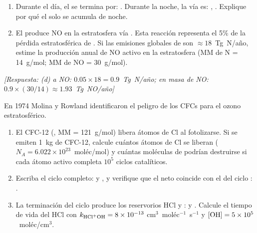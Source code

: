\begin{bloque_ejercicios}
\begin{ejercicios}
\begin{enumerate}[label=\alph*)]
    \item Durante el d\'ia, el  se termina por:
          .
          Durante la noche, la v\'ia es:
          ,
          .
          Explique por qu\'e el  solo se acumula
          de noche.

    \item El  produce NO en la estratosfera v\'ia
          .
          Esta reacci\'on representa el 5\% de la p\'erdida
          estratosf\'erica de .
          Si las emisiones globales de  son
          $\approx18$~Tg~N/a\~no, estime la producci\'on
          anual de NO activo en la estratosfera
          (MM de N = 14~g/mol;
          MM de NO = 30~g/mol).
\end{enumerate}

\textit{[Respuesta:
(d)  a NO: $0.05\times18 = 0.9$~Tg~N/a\~no;
    en masa de NO: $0.9\times(30/14)
    \approx 1.93$~Tg~NO/a\~no]}

\item En 1974 Molina y Rowland identificaron el peligro
de los CFCs para el ozono estratosf\'erico.

\begin{enumerate}[label=\alph*)]
    \item El CFC-12 (, MM = 121~g/mol)
          libera \'atomos de Cl al fotolizarse.
          Si se emiten \SI{1}{\kilo\gram} de CFC-12,
          calcule cu\'antos \'atomos de Cl se liberan
          ($N_A = 6.022\times10^{23}$~mol\'ec/mol)
          y cu\'antas mol\'eculas de  podr\'ian
          destruirse si cada \'atomo activo completa
          $10^5$ ciclos catal\'iticos.

    \item Escriba el ciclo  completo:
           y
          ,
          y verifique que el neto coincide con el del
          ciclo : .

    \item La terminaci\'on del ciclo  produce
          los reservorios HCl y :
           y
          .
          Calcule el tiempo de vida del HCl
          con $k_{\ce{HCl+OH}} = 8\times10^{-13}$
          cm$^3$~mol\'ec$^{-1}$~s$^{-1}$ y
          $[\ce{OH}] = 5\times10^5$~mol\'ec/cm$^3$.


\end{enumerate}
\end{ejercicios}
\end{bloque_ejercicios}
